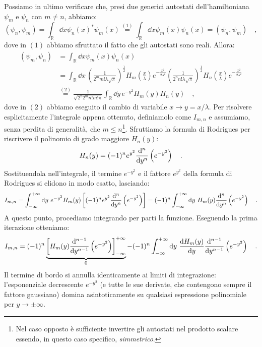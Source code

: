Possiamo in ultimo verificare che, presi due generici autostati dell'hamiltoniana $\psi_m$ e $\psi_n$ con $m \neq n$, abbiamo:
\[
    (\psi_n,\psi_m) = \int_{\mathbb{R}} \dd{x} \psi_n(x)^*\psi_m(x) \overset{(1)}{=} \int_{\mathbb{R}} \dd{x} \psi_m(x)\psi_n(x) = (\psi_n,\psi_m) \quad,
\]
dove in $(1)$ abbiamo sfruttato il fatto che gli autostati sono reali. Allora:
\[
    \begin{aligned}
        (\psi_m,\psi_n) &= \int_{\mathbb{R}} \dd{x}\psi_m(x)\psi_n(x) \\
        &= \int_{\mathbb{R}} \dd{x} \, \left( \frac{1}{2^m m! \lambda \sqrt{\pi}} \right)^{\frac{1}{2}} H_m\left(\frac{x}{\lambda}\right) e^{-\frac{x^2}{2\lambda^2}} \left( \frac{1}{2^n n! \lambda \sqrt{\pi}} \right)^{\frac{1}{2}} H_n\left(\frac{x}{\lambda}\right) e^{-\frac{x^2}{2\lambda^2}} \\
        &\overset{(2)}{=} \frac{1}{\sqrt{2^n2^m n! m! \pi}}\int_{\mathbb{R}} \dd{y} \, e^{-y^2}H_m(y)H_n(y) \quad,
    \end{aligned}
\]
dove in $(2)$ abbiamo eseguito il cambio di variabile $x \to y = x/\lambda$. Per risolvere esplicitamente l'integrale appena ottenuto, definiamolo come $I_{m,n}$ e assumiamo, senza perdita di generalità, che $m \leq n$\footnote{Nel caso opposto è sufficiente invertire gli autostati nel prodotto scalare essendo, in questo caso specifico, \textit{simmetrico}.}. Sfruttiamo la formula di Rodrigues per riscrivere il polinomio di grado maggiore $H_n(y)$:
\[
    H_n(y) = (-1)^n e^{y^2} \dv[n]{}{y} \left( e^{-y^2} \right) \quad.
\]
Sostituendola nell'integrale, il termine $e^{-y^2}$ e il fattore $e^{y^2}$ della formula di Rodrigues si elidono in modo esatto, lasciando:
\[
    I_{m,n} = \int_{-\infty}^{+\infty} \dd{y} \, e^{-y^2} H_m(y) \left[ (-1)^n e^{y^2} \dv[n]{}{y} \left( e^{-y^2} \right) \right] = (-1)^n \int_{-\infty}^{+\infty} \dd{y} \, H_m(y) \dv[n]{}{y} \left( e^{-y^2} \right) \quad.
\]
A questo punto, procediamo integrando per parti la funzione. Eseguendo la prima iterazione otteniamo:
\[
    I_{m,n} = (-1)^n \underbrace{\left[ H_m(y) \dv[n-1]{}{y}\left(e^{-y^2}\right) \right]_{-\infty}^{+\infty}}_{0} - (-1)^n \int_{-\infty}^{+\infty} \dd{y} \, \dv{H_m(y)}{y} \dv[n-1]{}{y} \left( e^{-y^2} \right) \quad.
\]
Il termine di bordo si annulla identicamente ai limiti di integrazione: l'esponenziale decrescente $e^{-y^2}$ (e tutte le sue derivate, che contengono sempre il fattore gaussiano) domina asintoticamente su qualsiasi espressione polinomiale per $y \to \pm\infty$. 

